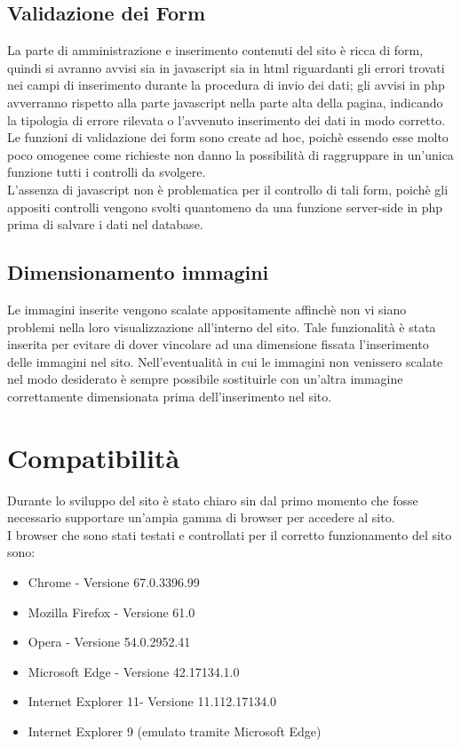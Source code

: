 \documentclass[a4paper,12pt]{article}
\begin{document}
\subsection{Validazione dei Form}
La parte di amministrazione e inserimento contenuti del sito è ricca di form, quindi si avranno avvisi sia in javascript sia in html riguardanti gli errori trovati nei campi di inserimento durante la procedura di invio dei dati; gli avvisi in php avverranno rispetto alla parte javascript nella parte alta della pagina, indicando la tipologia di errore rilevata o l'avvenuto inserimento dei dati in modo corretto.\\
Le funzioni di validazione dei form sono create ad hoc, poichè essendo esse molto poco omogenee come richieste non danno la possibilità di raggruppare in un'unica funzione tutti i controlli da svolgere.\\
L'assenza di javascript non è problematica per il controllo di tali form, poichè gli appositi controlli vengono svolti quantomeno da una funzione server-side in php prima di salvare i dati nel database.\\
\subsection{Dimensionamento immagini}
Le immagini inserite vengono scalate appositamente affinchè non vi siano problemi nella loro visualizzazione all'interno del sito. Tale funzionalità è stata inserita per evitare di dover vincolare ad una dimensione fissata l'inserimento delle immagini nel sito. Nell'eventualità in cui le immagini non venissero scalate nel modo desiderato è sempre possibile sostituirle con un'altra immagine correttamente dimensionata prima dell'inserimento nel sito.

\section{Compatibilità}
Durante lo sviluppo del sito è stato chiaro sin dal primo momento che fosse necessario supportare un'ampia gamma di browser per accedere al sito.
\\I browser che sono stati testati e controllati per il corretto funzionamento del sito sono:
\begin{itemize}
	\item Chrome - Versione 67.0.3396.99 
	\item Mozilla Firefox - Versione 61.0
	\item Opera - Versione 54.0.2952.41
	\item Microsoft Edge - Versione 42.17134.1.0
	\item Internet Explorer 11- Versione 11.112.17134.0
	\item Internet Explorer 9 (emulato tramite Microsoft Edge)
\end{itemize}
\end{document}
